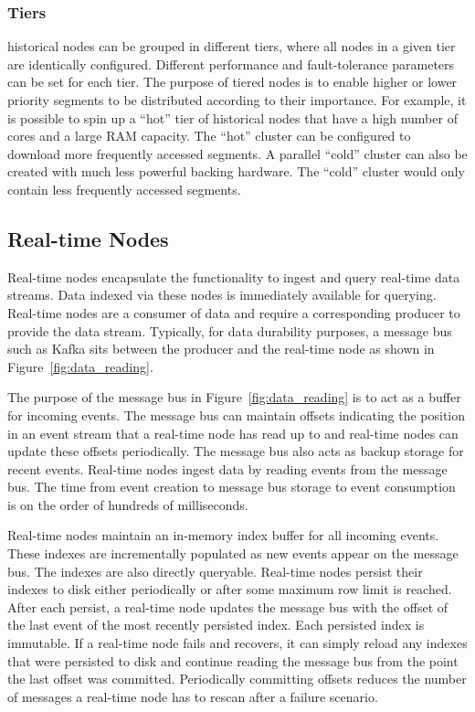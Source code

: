 \documentclass{vldb}
\begin{document}
\subsubsection{Tiers}
\label{sec:tiers}
historical nodes can be grouped in different tiers, where all nodes in a
given tier are identically configured. Different performance and
fault-tolerance parameters can be set for each tier. The purpose of
tiered nodes is to enable higher or lower priority segments to be
distributed according to their importance. For example, it is possible
to spin up a “hot” tier of historical nodes that have a high number of
cores and a large RAM capacity. The “hot” cluster can be configured to
download more frequently accessed segments. A parallel “cold” cluster
can also be created with much less powerful backing hardware. The
“cold” cluster would only contain less frequently accessed segments.

\subsection{Real-time Nodes}
\label{sec:realtime}
Real-time nodes encapsulate the functionality to ingest and query
real-time data streams. Data indexed via these nodes is immediately
available for querying. Real-time nodes are a consumer of data and
require a corresponding producer to provide the data
stream. Typically, for data durability purposes, a message bus such as
Kafka \cite{kreps2011kafka} sits between the producer and the real-time node as shown
in Figure~\ref{fig:data_reading}.

The purpose of the message bus in Figure~\ref{fig:data_reading} is to act as a buffer for
incoming events. The message bus can maintain offsets indicating the
position in an event stream that a real-time node has read up to and
real-time nodes can update these offsets periodically. The message bus also acts as backup storage for recent events.
Real-time nodes ingest data by reading events from the message bus. The time from event creation to message bus storage to
event consumption is on the order of hundreds of milliseconds.

Real-time nodes maintain an in-memory index buffer for all incoming
events. These indexes are incrementally populated as new events appear on the message bus. The indexes are also directly queryable.
Real-time nodes persist their indexes to disk either periodically or after some maximum row limit is
reached. After each persist, a real-time node updates the message bus
with the offset of the last event of the most recently persisted
index. Each persisted index is immutable. If a real-time node fails and recovers, it can simply reload
any indexes that were persisted to disk and continue reading the
message bus from the point the last offset was committed. Periodically committing offsets reduces the number of messages a real-time
node has to rescan after a failure scenario.
\end{document}
